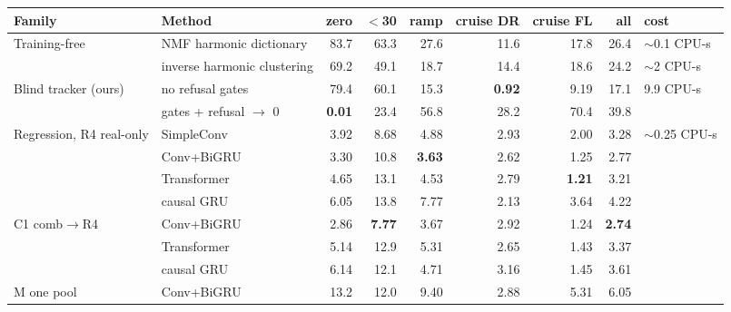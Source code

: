 \begin{tabular}{@{}llrrrrrrl@{}}
\toprule
Family & Method & zero & $<$30 & ramp & cruise DR & cruise FL & all & cost \\
\midrule
\multirow{2}{*}{Training-free} & NMF harmonic dictionary & 83.7 & 63.3 & 27.6 & 11.6 & 17.8 & 26.4 & $\sim$0.1 CPU-s \\
 & inverse harmonic clustering & 69.2 & 49.1 & 18.7 & 14.4 & 18.6 & 24.2 & $\sim$2 CPU-s \\
\midrule
\multirow{2}{*}{Blind tracker (ours)} & no refusal gates & 79.4 & 60.1 & 15.3 & \textbf{0.92} & 9.19 & 17.1 & \multirow{2}{*}{9.9 CPU-s} \\
 & gates + refusal $\to$ 0 & \textbf{0.01} & 23.4 & 56.8 & 28.2 & 70.4 & 39.8 &  \\
\midrule
\multirow{4}{*}{Regression, R4 real-only} & SimpleConv & 3.92 & 8.68 & 4.88 & 2.93 & 2.00 & 3.28 & \multirow{4}{*}{$\sim$0.25 CPU-s} \\
 & Conv+BiGRU & 3.30 & 10.8 & \textbf{3.63} & 2.62 & 1.25 & 2.77 &  \\
 & Transformer & 4.65 & 13.1 & 4.53 & 2.79 & \textbf{1.21} & 3.21 &  \\
 & causal GRU & 6.05 & 13.8 & 7.77 & 2.13 & 3.64 & 4.22 &  \\
\midrule
\multirow{3}{*}{C1 comb$\to$R4} & Conv+BiGRU & 2.86 & \textbf{7.77} & 3.67 & 2.92 & 1.24 & \textbf{2.74} &  \\
 & Transformer & 5.14 & 12.9 & 5.31 & 2.65 & 1.43 & 3.37 &  \\
 & causal GRU & 6.14 & 12.1 & 4.71 & 3.16 & 1.45 & 3.61 &  \\
\midrule
M one pool & Conv+BiGRU & 13.2 & 12.0 & 9.40 & 2.88 & 5.31 & 6.05 &  \\
\bottomrule
\end{tabular}
